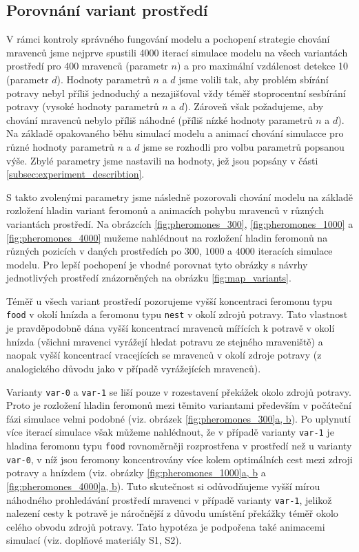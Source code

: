 \documentclass[10pt,a4paper,twocolumn]{article}
\begin{document}
\subsection{Porovnání variant prostředí}
\label{subsec:variant_comparision}

V rámci kontroly správného fungování modelu a pochopení strategie chování 
mravenců jsme nejprve spustili 4000 iterací simulace modelu na všech 
variantách prostředí pro 400 mravenců (parametr $n$) a pro maximální
vzdálenost detekce 10 (parametr $d$). Hodnoty parametrů $n$ a $d$ 
jsme volili tak, aby problém sbírání
potravy nebyl příliš jednoduchý a nezajišťoval vždy téměř stoprocentní
sesbírání potravy (vysoké hodnoty parametrů $n$ a $d$). Zároveň však
požadujeme, aby chování mravenců nebylo příliš náhodné 
(příliš nízké hodnoty parametrů $n$ a $d$). Na základě opakovaného 
běhu simulací modelu a animací chování simulacce pro různé hodnoty 
parametrů $n$ a $d$ jsme se rozhodli pro volbu parametrů popsanou výše. 
Zbylé parametry jsme nastavili na hodnoty, jež jsou popsány v části 
\ref{subsec:experiment_describtion}. 

S takto zvolenými parametry jsme následně pozorovali chování modelu na základě 
rozložení hladin variant feromonů a animacích pohybu mravenců v různých 
variantách prostředí. Na obrázcích \ref{fig:pheromones_300}, 
\ref{fig:pheromones_1000} a \ref{fig:pheromones_4000} 
mužeme nahlédnout na rozložení hladin feromonů na 
různých pozicích v daných prostředích po $300$, $1000$ a $4000$ 
iteracích simulace modelu. Pro lepší pochopení je vhodné porovnat 
tyto obrázky s návrhy jednotlivých prostředí znázorněných na obrázku
\ref{fig:map_variants}.

Téměř u všech variant prostředí pozorujeme vyšší koncentraci feromonu typu
\texttt{food} v okolí hnízda a feromonu typu \texttt{nest} v 
okolí zdrojů potravy. Tato vlastnost je pravděpodobně dána 
vyšší koncentrací mravenců mířících k potravě v okolí hnízda 
(všichni mravenci vyrážejí hledat potravu ze stejného mraveniště) a 
naopak vyšší koncentrací vracejících se mravenců v okolí zdroje
potravy (z analogického důvodu jako v případě vyrážejících mravenců).

Varianty \texttt{var-0} a \texttt{var-1} se liší pouze v rozestavení 
překážek okolo zdrojů potravy. Proto je rozložení hladin feromonů mezi
těmito variantami především v počáteční fázi simulace velmi podobné
(viz. obrázek \hyperref[fig:pheromones_300]{\ref*{fig:pheromones_300}a, b}). 
Po uplynutí více iterací 
simulace však můžeme nahlédnout, že v případě varianty \texttt{var-1}
je hladina feromonu typu \texttt{food} 
rovnoměrněji rozprostřena v prostředí než u
varianty \texttt{var-0}, v níž jsou feromony koncentrovány více kolem optimálních
cest mezi zdroji potravy a hnízdem (viz. obrázky 
\hyperref[fig:pheromones_1000]{\ref*{fig:pheromones_1000}a, b}
a \hyperref[fig:pheromones_4000]{\ref*{fig:pheromones_4000}a, b}). 
Tuto skutečnost
si odůvodňujeme vyšší mírou náhodného prohledávání prostředí mravenci
v případě varianty \texttt{var-1}, jelikož nalezení cesty k potravě
je náročnější z důvodu umístění překážky téměř okolo celého obvodu
zdrojů potravy. Tato hypotéza je podpořena také animacemi simulací 
(viz. doplňové materiály S1, S2).
\end{document}
